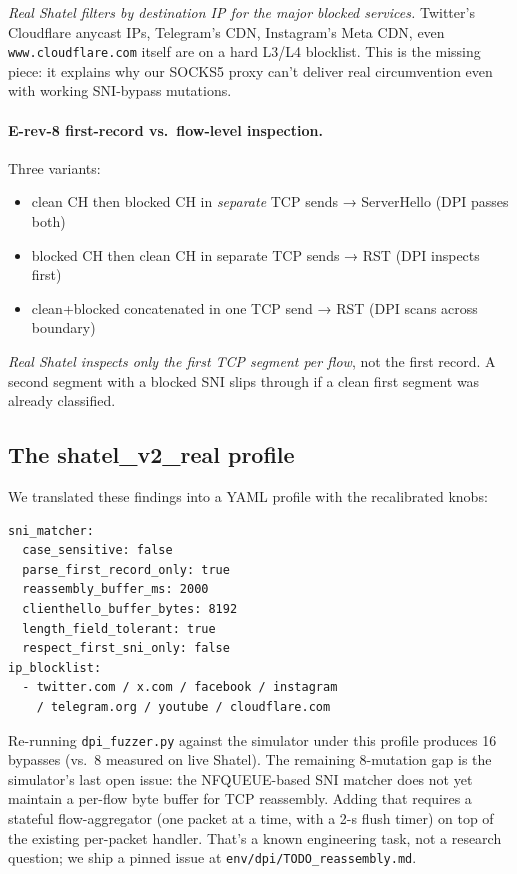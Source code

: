 \documentclass[letterpaper,twocolumn,10pt]{article}
\begin{document}
\emph{Real Shatel filters by destination IP for the major blocked
services.} Twitter's Cloudflare anycast IPs, Telegram's CDN,
Instagram's Meta CDN, even \texttt{www.cloudflare.com} itself are
on a hard L3/L4 blocklist. This is the missing piece: it explains
why our SOCKS5 proxy can't deliver real circumvention even with
working SNI-bypass mutations.

\paragraph{E-rev-8 first-record vs.\ flow-level inspection.}
Three variants:
\begin{itemize}
    \item clean CH then blocked CH in \emph{separate} TCP sends → ServerHello (DPI passes both)
    \item blocked CH then clean CH in separate TCP sends → RST (DPI inspects first)
    \item clean+blocked concatenated in one TCP send → RST (DPI scans across boundary)
\end{itemize}
\emph{Real Shatel inspects only the first TCP segment per flow}, not
the first record. A second segment with a blocked SNI slips through
if a clean first segment was already classified.

\subsection{The shatel\_v2\_real profile}

We translated these findings into a YAML profile with the
recalibrated knobs:

{\small\begin{verbatim}
sni_matcher:
  case_sensitive: false
  parse_first_record_only: true
  reassembly_buffer_ms: 2000
  clienthello_buffer_bytes: 8192
  length_field_tolerant: true
  respect_first_sni_only: false
ip_blocklist:
  - twitter.com / x.com / facebook / instagram
    / telegram.org / youtube / cloudflare.com
\end{verbatim}}

Re-running \texttt{dpi\_fuzzer.py} against the simulator under this
profile produces 16 bypasses (vs.\ 8 measured on live Shatel). The
remaining 8-mutation gap is the simulator's last open issue: the
NFQUEUE-based SNI matcher does not yet maintain a per-flow byte
buffer for TCP reassembly. Adding that requires a stateful
flow-aggregator (one packet at a time, with a 2-s flush timer) on
top of the existing per-packet handler. That's a known engineering
task, not a research question; we ship a pinned issue at
\texttt{env/dpi/TODO\_reassembly.md}.
\end{document}
